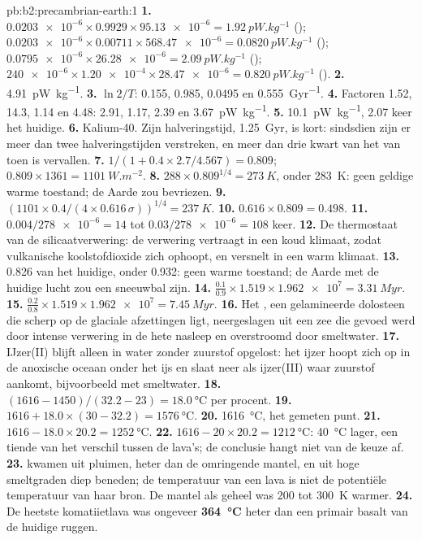 \begin{solution}{pb:b2:precambrian-earth:1}
\textbf{1.} $\num{0.0203e-6}\times0.9929\times\num{95.13e-6} = \qty{1.92}{pW.kg^{-1}}$
(); $\num{0.0203e-6}\times0.00711\times\num{568.47e-6} = \qty{0.0820}{pW.kg^{-1}}$
(); $\num{0.0795e-6}\times\num{26.28e-6} = \qty{2.09}{pW.kg^{-1}}$ ();
$\num{240e-6}\times\num{1.20e-4}\times\num{28.47e-6} = \qty{0.820}{pW.kg^{-1}}$ ().
\textbf{2.} \qty{4.91}{pW.kg^{-1}}.
\textbf{3.} $\ln2/T$: 0.155, 0.985, 0.0495 en \qty{0.555}{Gyr^{-1}}.
\textbf{4.} Factoren 1.52, 14.3, 1.14 en 4.48: 2.91, 1.17, 2.39 en \qty{3.67}{pW.kg^{-1}}.
\textbf{5.} \qty{10.1}{pW.kg^{-1}}, 2.07 keer het huidige.
\textbf{6.} Kalium-40. Zijn halveringstijd, \qty{1.25}{Gyr}, is kort: sindsdien zijn er meer dan twee halveringstijden
verstreken, en meer dan drie kwart van het  van toen is vervallen.
\textbf{7.} $1/(1 + 0.4\times2.7/4.567) = 0.809$; $0.809\times1361 = \qty{1101}{W.m^{-2}}$.
\textbf{8.} $288\times0.809^{1/4} = \qty{273}{K}$, onder \qty{283}{K}: geen geldige warme toestand;
de Aarde zou bevriezen.
\textbf{9.} $(1101\times0.4/(4\times0.616\,\sigma))^{1/4} = \qty{237}{K}$.
\textbf{10.} $0.616\times0.809 = 0.498$.
\textbf{11.} $0.004/\num{278e-6} = 14$ tot $0.03/\num{278e-6} = 108$ keer.
\textbf{12.} De thermostaat van de silicaatverwering: de verwering vertraagt in een koud klimaat, zodat
vulkanische koolstofdioxide zich ophoopt, en versnelt in een warm klimaat.
\textbf{13.} 0.826 van het huidige, onder 0.932: geen warme toestand; de Aarde met de huidige lucht zou een
sneeuwbal zijn.
\textbf{14.} $\frac{0.1}{0.9}\times1.519\times\num{1.962e7} = \qty{3.31}{Myr}$.
\textbf{15.} $\frac{0.2}{0.8}\times1.519\times\num{1.962e7} = \qty{7.45}{Myr}$.
\textbf{16.} Het , een gelamineerde dolosteen die scherp op de glaciale afzettingen ligt,
neergeslagen uit een zee die gevoed werd door intense verwering in de hete nasleep en overstroomd door
smeltwater.
\textbf{17.} IJzer(II) blijft alleen in water zonder zuurstof opgelost: het ijzer hoopt zich op in de
anoxische oceaan onder het ijs en slaat neer als ijzer(III) waar zuurstof aankomt, bijvoorbeeld met
smeltwater.
\textbf{18.} $(1616 - 1450)/(32.2 - 23) = \qty{18.0}{\celsius}$ per procent.
\textbf{19.} $1616 + 18.0\times(30 - 32.2) = \qty{1576}{\celsius}$.
\textbf{20.} \qty{1616}{\celsius}, het gemeten punt.
\textbf{21.} $1616 - 18.0\times20.2 = \qty{1252}{\celsius}$.
\textbf{22.} $1616 - 20\times20.2 = \qty{1212}{\celsius}$: \qty{40}{\celsius} lager, een tiende van
het verschil tussen de lava's; de conclusie hangt niet van de keuze af.
\textbf{23.}  kwamen uit pluimen, heter dan de omringende mantel, en uit hoge smeltgraden
diep beneden; de temperatuur van een lava is niet de potentiële temperatuur van haar bron. De
mantel als geheel was 200 tot \qty{300}{K} warmer.
\textbf{24.} De heetste komatiietlava was ongeveer \textbf{\qty{364}{\celsius}} heter dan een
primair basalt van de huidige ruggen.
\end{solution}
